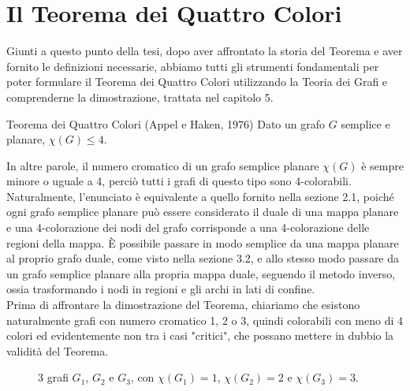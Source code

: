 \documentclass[a4paper,12pt,titlepage]{report}
\begin{document}
    \section{Il Teorema dei Quattro Colori}
    Giunti a questo punto della tesi, dopo aver affrontato la storia del Teorema e aver fornito le definizioni necessarie, abbiamo tutti gli strumenti fondamentali per poter formulare il Teorema dei Quattro Colori utilizzando la Teoria dei Grafi e comprenderne la dimostrazione, trattata nel capitolo 5.
    \begin{namedthm*}{Teorema dei Quattro Colori (Appel e Haken, 1976)}
    	Dato un grafo $G$ semplice e planare, $\chi(G) \leq 4$.
    \end{namedthm*}
    \noindent In altre parole, il numero cromatico di un grafo semplice planare $\chi(G)$ è sempre minore o uguale a 4, perciò tutti i grafi di questo tipo sono 4-colorabili.
    \\Naturalmente, l'enunciato è equivalente a quello fornito nella sezione 2.1, poiché ogni grafo semplice planare può essere considerato il duale di una mappa planare e una 4-colorazione dei nodi del grafo corrisponde a una 4-colorazione delle regioni della mappa.
    È possibile passare in modo semplice da una mappa planare al proprio grafo duale, come visto nella sezione 3.2, e allo stesso modo passare da un grafo semplice planare alla propria mappa duale, seguendo il metodo inverso, ossia trasformando i nodi in regioni e gli archi in lati di confine.
    \\Prima di affrontare la dimostrazione del Teorema, chiariamo che esistono naturalmente grafi con numero cromatico 1, 2 o 3, quindi colorabili con meno di 4 colori ed evidentemente non tra i casi "critici", che possano mettere in dubbio la validità del Teorema.
    \begin{figure}[h]
    	\centering
        \vspace{0.4cm}
        \caption{3 grafi $G_1$, $G_2$ e $G_3$, con $\chi(G_1) = 1$, $\chi(G_2) = 2$ e $\chi(G_3) = 3$.}
    \end{figure}
\end{document}
